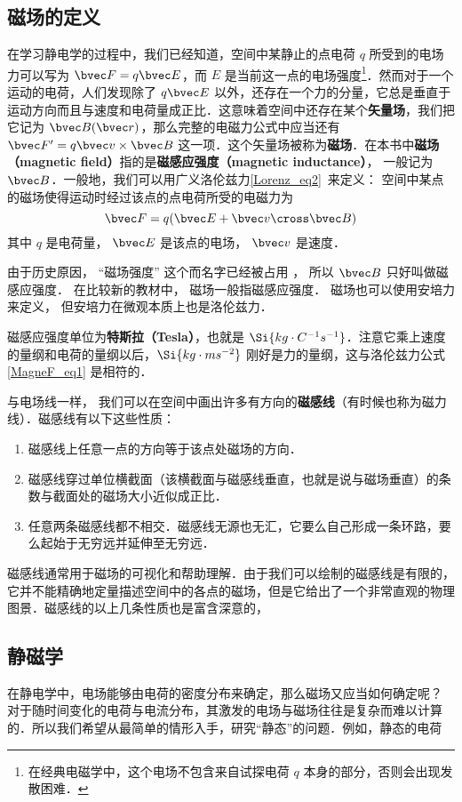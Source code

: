 
\begin{issues}
\issueDraft
\end{issues}

\subsection{磁场的定义}
在学习静电学的过程中，我们已经知道，空间中某静止的点电荷 $q$ 所受到的电场力可以写为 $\bvec F=q\bvec E$，而 $E$ 是当前这一点的电场强度\footnote{在经典电磁学中，这个电场不包含来自试探电荷 $q$ 本身的部分，否则会出现发散困难．}．然而对于一个运动的电荷，人们发现除了 $q\bvec E$ 以外，还存在一个力的分量，它总是垂直于运动方向而且与速度和电荷量成正比．这意味着空间中还存在某个\textbf{矢量场}，我们把它记为 $\bvec B(\bvec r)$，那么完整的电磁力公式中应当还有 $\bvec F'=q\bvec v\times \bvec B$ 这一项．这个矢量场被称为\textbf{磁场}．在本书中\textbf{磁场（magnetic field）}指的是\textbf{磁感应强度（magnetic inductance）}， 一般记为 $\bvec B$．一般地，我们可以用广义洛伦兹力\autoref{Lorenz_eq2}~来定义： 空间中某点的磁场使得运动时经过该点的点电荷所受的电磁力为
\begin{equation}\label{MagneF_eq1}
\bvec F = q(\bvec E + \bvec v \cross \bvec B)
\end{equation}
其中 $q$ 是电荷量， $\bvec E$ 是该点的电场， $\bvec v$ 是速度．

由于历史原因， “磁场强度” 这个而名字已经被占用%
， 所以 $\bvec B$ 只好叫做磁感应强度． 在比较新的教材中， 磁场一般指磁感应强度． 磁场也可以使用安培力来定义， 但安培力在微观本质上也是洛伦兹力． 


磁感应强度单位为\textbf{特斯拉（Tesla）}，也就是 $\Si{kg\cdot C^{-1}s^{-1}}$．注意它乘上速度的量纲和电荷的量纲以后，$\Si{kg\cdot ms^{-2}}$ 刚好是力的量纲，这与洛伦兹力公式\autoref{MagneF_eq1} 是相符的．

与电场线一样， 我们可以在空间中画出许多有方向的\textbf{磁感线}（有时候也称为磁力线）．磁感线有以下这些性质：
\begin{enumerate}
\item 磁感线上任意一点的方向等于该点处磁场的方向．
\item 磁感线穿过单位横截面（该横截面与磁感线垂直，也就是说与磁场垂直）的条数与截面处的磁场大小近似成正比．
\item 任意两条磁感线都不相交．磁感线无源也无汇，它要么自己形成一条环路，要么起始于无穷远并延伸至无穷远．
\end{enumerate}
磁感线通常用于磁场的可视化和帮助理解．由于我们可以绘制的磁感线是有限的，它并不能精确地定量描述空间中的各点的磁场，但是它给出了一个非常直观的物理图景．磁感线的以上几条性质也是富含深意的，


\subsection{静磁学}
在静电学中，电场能够由电荷的密度分布来确定，那么磁场又应当如何确定呢？
对于随时间变化的电荷与电流分布，其激发的电场与磁场往往是复杂而难以计算的．所以我们希望从最简单的情形入手，研究“静态”的问题．例如，静态的电荷